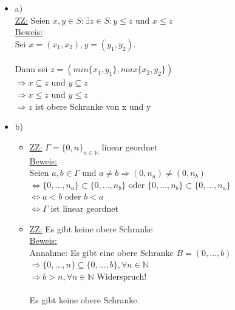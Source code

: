 \documentclass[a4paper]{scrartcl}
\begin{document}
    \begin{itemize}
        \item a)\\
            \underline{ZZ:} Seien $x,y \in S: \exists z \in S: y \leq z \text{ und } x \leq z$\\
            \underline{Beweis:}\\
                Sei $x = (x_1,x_2), y = (y_1,y_2).$\\
                \\Dann sei $z = (min\{x_1,y_1\}, max\{x_2,y_2\})$\\
                $\Rightarrow x \subseteq z$ und $y \subseteq z$\\
                $\Rightarrow x \leq z \text{ und } y \leq z$\\
                $\Rightarrow z$ ist obere Schranke von x und y\\

        \item b)\\
            \begin{itemize}
                \item \underline{ZZ:} $\Gamma = \{0,n\}_{n \in \mathds{N}}$ linear geordnet\\
                    \underline{Beweis:}\\
                    Seien $a,b \in \Gamma$ und $a \neq b \Rightarrow (0,n_a) \neq (0,n_b)$\\
                    $\Leftrightarrow \{0,\dots,n_a\} \subset \{0,\dots,n_b\} \text{ oder } \{0,\dots,n_b\} \subset \{0,\dots,n_a\}$\\
                    $\Leftrightarrow a < b \text{ oder } b < a$\\
                    $\Leftrightarrow \Gamma$ ist linear geordnet

                \item \underline{ZZ:} Es gibt keine obere Schranke\\
                    \underline{Beweis:}\\
                        Annahme: Es gibt eine obere Schranke $B = (0,\dots,b)$\\
                        $\Rightarrow \{0,\dots,n\} \subseteq \{0,\dots,b\}, \forall n \in \mathds{N}$\\
                        $\Rightarrow b > n, \forall n \in \mathds{N}$ Widerspruch!\\
                        \\Es gibt keine obere Schranke.\\


\end{itemize}
\end{itemize}
\end{document}

